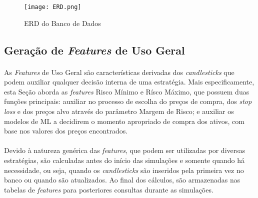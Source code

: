 \begin{landscape}

\begin{figure}[!htb]
    \texttt{[image: ERD.png]}
    \centering
    \caption{ERD do Banco de Dados}
    \label{fig:103}
\end{figure}

\end{landscape}




\FloatBarrier
\subsection{Geração de \textit{Features} de Uso Geral}
\label{sub:features}

\paragraph{} As \textit{Features} de Uso Geral são características derivadas dos \textit{candlesticks} que podem auxiliar qualquer decisão interna de uma estratégia. Mais especificamente, esta Seção aborda as \textit{features} Risco Mínimo e Rísco Máximo, que possuem duas funções principais: auxiliar no processo de escolha do preços de compra, dos \textit{stop loss} e dos preços alvo através do parâmetro Margem de Risco; e auxiliar os modelos de ML a decidirem o momento apropriado de compra dos ativos, com base nos valores dos preços encontrados.

\paragraph{} Devido à natureza genérica das \textit{features}, que podem ser utilizadas por diversas estratégias, são calculadas antes do início das simulações e somente quando há necessidade, ou seja, quando os \textit{candlesticks} são inseridos pela primeira vez no banco ou quando são atualizados. Ao final dos cálculos, são armazenadas nas tabelas de \textit{features} para posteriores consultas durante as simulações.

